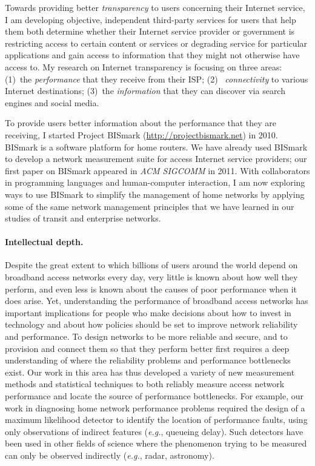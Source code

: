\documentclass{article}
\newcommand{\eg}{{\em e.g.}}
\begin{document}
Towards providing better {\em transparency} to users concerning their
Internet service, I am developing objective, independent third-party
services for users that help them both determine whether their Internet
service provider or government is restricting access to certain content
or services or degrading service for particular applications and gain
access to information that they might not otherwise have access to.  My
research on Internet transparency is focusing on three areas: (1)~the
{\em performance} that they receive from their ISP; (2)~{\em
connectivity} to various Internet destinations; (3)~the {\em
information} that they can discover via search engines and social media.

To provide users better information about the performance that they are
receiving, I started Project BISmark (\url{http://projectbismark.net})
in 2010. BISmark is a software platform for home routers.  We have
already used BISmark to develop a network measurement suite for access
Internet service providers; our first paper on BISmark appeared in {\em
ACM SIGCOMM} in 2011.  With collaborators in programming languages and
human-computer interaction, I am now exploring ways to use BISmark to
simplify the management of home networks by applying some of the same
network management principles that we have learned in our studies of
transit and enterprise networks.

\paragraph{Intellectual depth.} Despite the great extent to which billions
of users around the world depend on broadband access networks every day,
very little is known about how well they perform, and even less is known
about the causes of poor performance when it does arise.  Yet,
understanding the performance of broadband access networks has important
implications for people who make decisions about how to invest in
technology and about how policies should be set to improve network
reliability and performance.  To design networks to be more reliable and
secure, and to provision and connect them so that they perform better
first requires a deep understanding of where the reliability problems
and performance bottlenecks exist.  Our work in this area has thus
developed a variety of new measurement methods and statistical
techniques to both reliably measure access network performance and
locate the source of performance bottlenecks.  For example, our work in
diagnosing home network performance problems required the design of a
maximum likelihood detector to identify the location of performance
faults, using only observations of indirect features (\eg, queueing
delay).  Such detectors have been used in other fields of science where
the phenomenon trying to be measured can only be observed indirectly
(\eg, radar, astronomy).  
\end{document}
